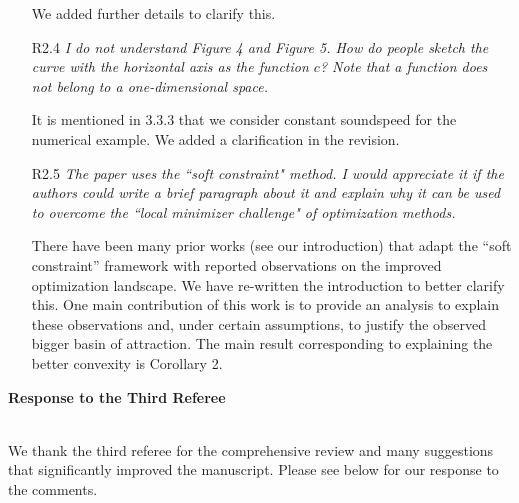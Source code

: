 \documentclass[11pt]{article}
\newcommand{\mycomment}[1]{\textit{\color{bluey}#1}}
\begin{document}
\begin{itemize}
We added further details to clarify this.


    \item[R2.4] \mycomment{I do not understand Figure 4 and Figure 5. How do people sketch the curve with the horizontal axis as the function $c$? Note that a function does not belong to a one-dimensional space.}

It is mentioned in 3.3.3 that we consider constant soundspeed for the numerical example. We added a clarification in the revision.




 
    \item[R2.5] \mycomment{The paper uses the ``soft constraint" method. I would appreciate it if the authors could write a brief paragraph about it and explain why it can be used to overcome the ``local minimizer challenge" of optimization methods.}

    There have been many prior works (see our introduction) that adapt the ``soft constraint'' framework with reported observations on the improved optimization landscape. We have re-written the introduction to better clarify this. One main contribution of this work is to provide an analysis to explain these observations and, under certain assumptions, to justify the observed bigger basin of attraction. The main result corresponding to explaining the better convexity is Corollary 2.
    
\end{itemize}

\newpage

\centerline{\textbf{{\large Response to the Third Referee}}}
\ \\
We thank the third referee for the comprehensive review and many suggestions that significantly improved the manuscript. Please see below for our response to the comments. 
\end{document}
